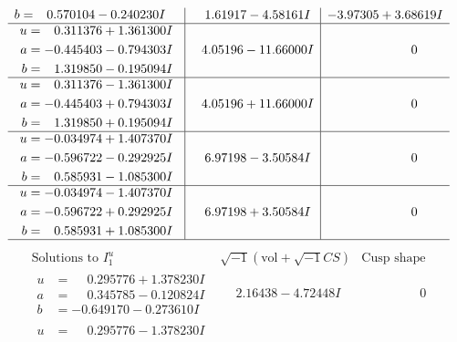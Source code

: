 \documentclass[1p]{elsarticle_modified}
\theoremstyle{definition}
\newcommand{\I}{\sqrt{-1}}
\begin{document}
$$\begin{array}{c|c|c}
\begin{aligned}
b &= \phantom{-}0.570104 - 0.240230 I\end{aligned}
 & \phantom{-}1.61917 - 4.58161 I & -3.97305 + 3.68619 I \\ \hline\begin{aligned}
u &= \phantom{-}0.311376 + 1.361300 I \\
a &= -0.445403 - 0.794303 I \\
b &= \phantom{-}1.319850 - 0.195094 I\end{aligned}
 & \phantom{-}4.05196 - 11.66000 I & \phantom{-0.000000 } 0 \\ \hline\begin{aligned}
u &= \phantom{-}0.311376 - 1.361300 I \\
a &= -0.445403 + 0.794303 I \\
b &= \phantom{-}1.319850 + 0.195094 I\end{aligned}
 & \phantom{-}4.05196 + 11.66000 I & \phantom{-0.000000 } 0 \\ \hline\begin{aligned}
u &= -0.034974 + 1.407370 I \\
a &= -0.596722 - 0.292925 I \\
b &= \phantom{-}0.585931 - 1.085300 I\end{aligned}
 & \phantom{-}6.97198 - 3.50584 I & \phantom{-0.000000 } 0 \\ \hline\begin{aligned}
u &= -0.034974 - 1.407370 I \\
a &= -0.596722 + 0.292925 I \\
b &= \phantom{-}0.585931 + 1.085300 I\end{aligned}
 & \phantom{-}6.97198 + 3.50584 I & \phantom{-0.000000 } 0\\
 \hline 
 \end{array}$$\newpage$$\begin{array}{c|c|c}  
\text{Solutions to }I^u_{1}& \I (\text{vol} + \sqrt{-1}CS) & \text{Cusp shape}\\
 \hline 
\begin{aligned}
u &= \phantom{-}0.295776 + 1.378230 I \\
a &= \phantom{-}0.345785 - 0.120824 I \\
b &= -0.649170 - 0.273610 I\end{aligned}
 & \phantom{-}2.16438 - 4.72448 I & \phantom{-0.000000 } 0 \\ \hline\begin{aligned}
u &= \phantom{-}0.295776 - 1.378230 I \\

\end{aligned}
\end{array}$$
\end{document}
